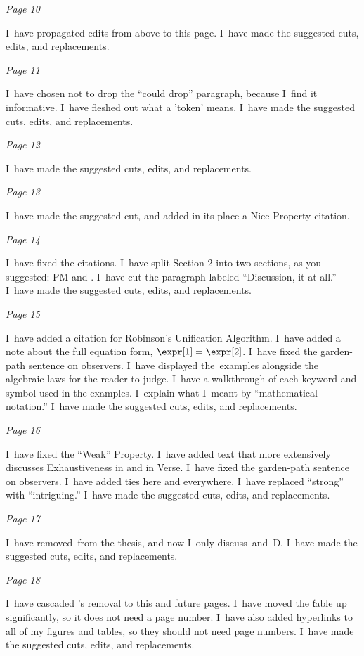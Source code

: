 \documentclass[manuscript,screen, 12pt, nonacm]{acmart}
\begin{document}
\it{Page 10}

I~have propagated edits from above to this page. I~have made the suggested cuts,
edits, and replacements. 


\it{Page 11}

I~have chosen not to drop the “could drop” paragraph, because I~find it
informative. I~have fleshed out what a 'token' means. I~have made the suggested
cuts, edits, and replacements. 

\it{Page 12}

I~have made the suggested cuts, edits, and replacements. 

\it{Page 13}

I~have made the suggested cut, and added in its place a Nice Property citation.


\it{Page 14}

I~have fixed the citations. I~have split Section 2 into two sections, as you
suggested: PM and \VC. I~have cut the paragraph labeled “Discussion, it at all.”
I~have made the suggested cuts, edits, and replacements. 

\it{Page 15}

I~have added a citation for Robinson's Unification Algorithm. I~have added a
note about the full equation form, $\expr[1] = \expr[2]$. I~have fixed the
garden-path sentence on observers. I~have displayed the~\VC examples alongside
the algebraic laws for the reader to judge. I~have a walkthrough of each keyword
and symbol used in the examples. I~explain what I~meant by “mathematical notation.”
I~have made the suggested cuts, edits, and replacements. 

\it{Page 16}

I~have fixed the “Weak” Property. I~have added text that more extensively
discusses Exhaustiveness in \VC and in Verse. I~have fixed the garden-path
sentence on observers. I~have added ties here and everywhere.  I~have replaced
“strong” with “intriguing.” I~have made the suggested cuts, edits, and
replacements. 

\it{Page 17}

I~have removed~\PPlus from the thesis, and now I~only discuss~\VMinus and~D.
I~have made the suggested cuts, edits, and replacements. 

\it{Page 18}

I~have cascaded {\PPlus}'s removal to this and future pages. I~have moved the \U
table up significantly, so it does not need a page number. I~have also added
hyperlinks to all of my figures and tables, so they should not need page
numbers. I~have made the suggested cuts, edits, and replacements. 
\end{document}
